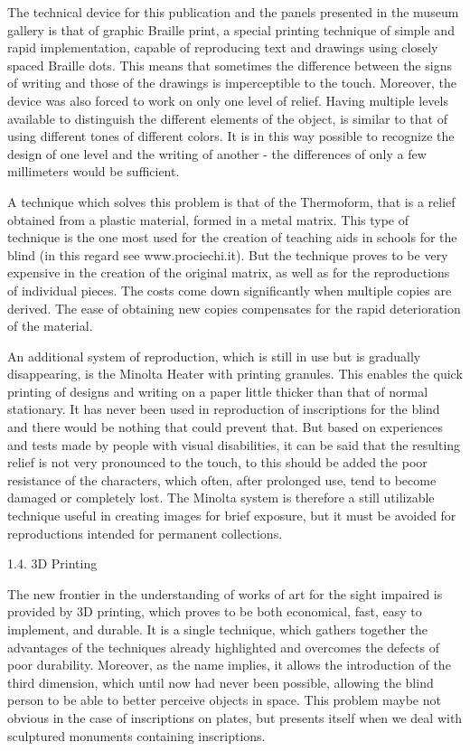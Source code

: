 \documentclass[amsthm,ebook]{saparticle}
\begin{document}
The technical device for this publication and the panels presented in the museum gallery is that of graphic Braille
print, a special printing technique of simple and rapid implementation, capable of reproducing text and drawings using
closely spaced Braille dots. This means that sometimes the difference between the signs of writing and those of the
drawings is imperceptible to the touch. Moreover, the device was also forced to work on only one level of relief.
Having multiple levels available to distinguish the different elements of the object, is similar to that of using
different tones of different colors. It is in this way possible to recognize the design of one level and the writing of
another - the differences of only a few millimeters would be sufficient.

A technique which solves this problem is that of the Thermoform, that is a relief obtained from a plastic material,
formed in a metal matrix. This type of technique is the one most used for the creation of teaching aids in schools for
the blind (in this regard see www.prociechi.it). But the technique proves to be very expensive in the creation of the
original matrix, as well as for the reproductions of individual pieces. The costs come down significantly when multiple
copies are derived. The ease of obtaining new copies compensates for the rapid deterioration of the material.

An additional system of reproduction, which is still in use but is gradually disappearing, is the Minolta Heater with
printing granules. This enables the quick printing of designs and writing on a paper little thicker than that of normal
stationary. It has never been used in reproduction of inscriptions for the blind and there would be nothing that could
prevent that. But based on experiences and tests made by people with visual disabilities, it can be said that the
resulting relief is not very pronounced to the touch, to this should be added the poor resistance of the characters,
which often, after prolonged use, tend to become damaged or completely lost. The Minolta system is therefore a still
utilizable technique useful in creating images for brief exposure, but it must be avoided for reproductions intended
for permanent collections.


\bigskip


\bigskip

1.4. 3D Printing


\bigskip

The new frontier in the understanding of works of art for the sight impaired is provided by 3D printing, which proves to
be both economical, fast, easy to implement, and durable. It is a single technique, which gathers together the
advantages of the techniques already highlighted and overcomes the defects of poor durability. Moreover, as the name
implies, it allows the introduction of the third dimension, which until now had never been possible, allowing the blind
person to be able to better perceive objects in space. This problem maybe not obvious in the case of inscriptions on
plates, but presents itself when we deal with sculptured monuments containing inscriptions.
\end{document}
